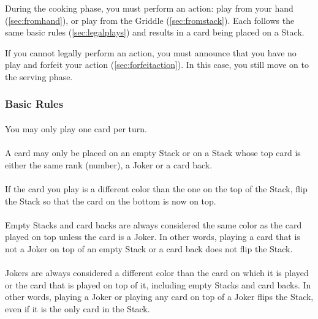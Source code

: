 \documentclass{article}
\begin{document}
During the cooking phase, you must perform an action: play from your hand (\autoref{sec:fromhand}), or play from the Griddle (\autoref{sec:fromstack}). Each follows the same basic rules (\autoref{sec:legalplays}) and results in a card being placed on a Stack.

If you cannot legally perform an action, you must announce that you have no play and forfeit your action (\autoref{sec:forfeitaction}). In this case, you still move on to the serving phase.

\subsubsection{Basic Rules}
\label{sec:legalplays}

\paragraph{} \label{par:onecard}
You may only play one card per turn.

\paragraph{} \label{par:basicplay}
A card may only be placed on an empty Stack or on a Stack whose top card is either the same rank (number), a Joker or a card back.

\paragraph{} \label{par:flip}
If the card you play is a different color than the one on the top of the Stack, flip the Stack so that the card on the bottom is now on top.

\paragraph{} \label{par:empty}
Empty Stacks and card backs are always considered the same color as the card played on top unless the card is a Joker.
In other words, playing a card that is not a Joker on top of an empty Stack or a card back does not flip the Stack.

\paragraph{} \label{par:joker}
Jokers are always considered a different color than the card on which it is played or the card that is played on top of it, including empty Stacks and card backs.
In other words, playing a Joker or playing any card on top of a Joker flips the Stack, even if it is the only card in the Stack.
\end{document}
